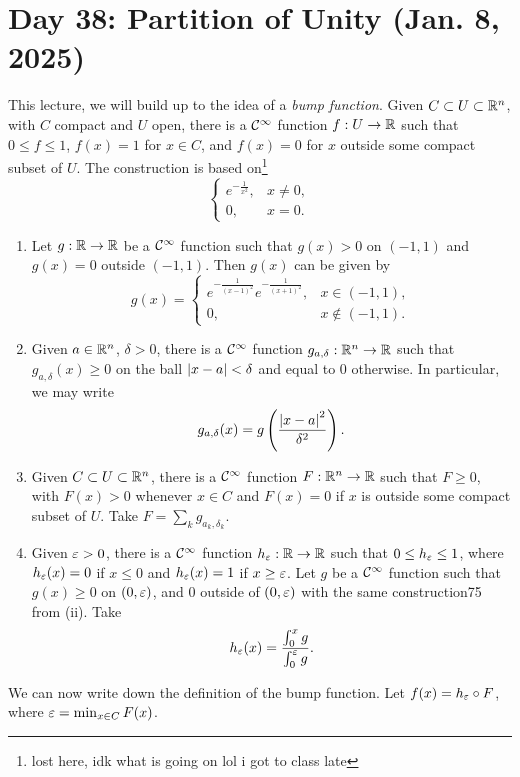 \section{Day 38: Partition of Unity (Jan. 8, 2025)}
This lecture, we will build up to the idea of a \textit{bump function}. Given $C \subset U \subset \mathbb R^n$, with $C$ compact and $U$ open, there is a $\mathcal C^\infty$ function $f : U \to \mathbb R$ such that $0 \leq f \leq 1$, $f(x) = 1$ for $x \in C$, and $f(x) = 0$ for $x$ outside some compact subset of $U$. The construction is based on\footnote{lost here, idk what is going on lol i got to class late}
\[ \begin{cases} e^{-\frac{1}{x^2}} , &x \neq 0, \\ 0, &x = 0. \end{cases} \]
\begin{enumerate}[label=(\roman*)]
    \item Let $g : \mathbb R \to \mathbb R$ be a $\mathcal C^\infty$ function such that $g(x) > 0$ on $(-1, 1)$ and $g(x) = 0$ outside $(-1, 1)$. Then $g(x)$ can be given by
    \[ g(x) = \begin{cases} e^{-\frac{1}{(x-1)^2}} e^{-\frac{1}{(x+1)^2}}, &x \in (-1, 1), \\ 0, &x \not\in (-1, 1). \end{cases} \]
    \item Given $a \in \mathbb R^n$, $\delta > 0$, there is a $\mathcal C^\infty$ function $g_{a,\delta} : \mathbb R^n \to \mathbb R$  such that $g_{a,\delta}(x) \geq 0$ on the ball $\left\lvert x - a \right\rvert < \delta$ and equal to $0$ otherwise. In particular, we may write
    \[ g_{a,\delta}(x) = g\left(\frac{\left\lvert x - a \right\rvert^2}{\delta^2}\right). \]
    \item Given $C \subset U \subset \mathbb R^n$, there is a $\mathcal C^\infty$ function $F : \mathbb R^n \to \mathbb R$ such that $F \geq 0$, with $F(x) > 0$ whenever $x \in C$ and $F(x) = 0$ if $x$ is outside some compact subset of $U$. Take $F = \sum_{k} g_{a_k, \delta_k}$.
    \item Given $\varepsilon > 0$, there is a $\mathcal C^\infty$ function $h_\varepsilon : \mathbb R \to \mathbb R$ such that $0 \leq h_\varepsilon \leq 1$, where $h_\varepsilon(x) = 0$ if $x \leq 0$ and $h_\varepsilon(x) = 1$ if $x \geq \varepsilon$. Let $g$ be a $\mathcal C^\infty$ function such that $g(x) \geq 0$ on $(0, \varepsilon)$, and $0$ outside of $(0, \varepsilon)$ with the same construction75 from (ii). Take
    \[ h_\varepsilon(x) = \dfrac{\int_0^x g}{\int_0^\varepsilon g}. \]
\end{enumerate}
We can now write down the definition of the bump function. Let $f(x) = h_\varepsilon \circ F$, where $\varepsilon = \min_{x \in C} F(x)$.
